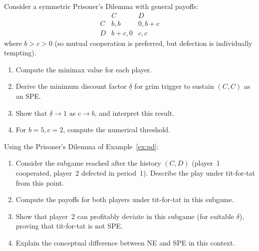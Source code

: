 \documentclass[11pt,a4paper]{article}
\begin{document}
\begin{exercise}
\label{ex:grim-threshold}
Consider a symmetric Prisoner's Dilemma with general payoffs:
\[
\begin{array}{c|cc}
  & C & D \\ \hline
C & b,b & 0, b+c \\
D & b+c, 0 & c, c
\end{array}
\]
where $b > c > 0$ (so mutual cooperation is preferred, but defection is
individually tempting).
\begin{enumerate}[label=(\alph*)]
    \item Compute the minimax value for each player.
    \item Derive the minimum discount factor $\underline{\delta}$ for grim
    trigger to sustain $(C,C)$ as an SPE.
    \item Show that $\underline{\delta} \to 1$ as $c \to b$, and interpret
    this result.
    \item For $b = 5, c = 2$, compute the numerical threshold.
\end{enumerate}
\end{exercise}

\begin{exercise}
\label{ex:tft-not-spe}
Using the Prisoner's Dilemma of Example~\ref{ex:pd}:
\begin{enumerate}[label=(\alph*)]
    \item Consider the subgame reached after the history $(C, D)$ (player~1
    cooperated, player~2 defected in period~1). Describe the play under
    tit-for-tat from this point.
    \item Compute the payoffs for both players under tit-for-tat in this
    subgame.
    \item Show that player~2 can profitably deviate in this subgame
    (for suitable $\delta$), proving that tit-for-tat is not SPE.
    \item Explain the conceptual difference between NE and SPE in this
    context.
\end{enumerate}
\end{exercise}
\end{document}

